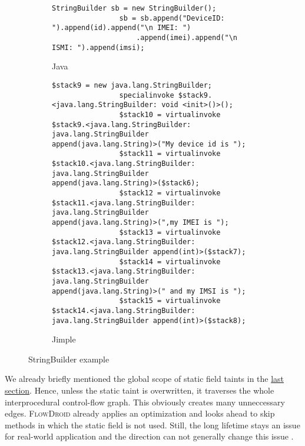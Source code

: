 \documentclass[../draft.tex]{subfiles}
\begin{document}
    \begin{figure}[tbp]
        \centering
        \begin{subfigure}[b]{\textwidth}
            \begin{lstlisting}[gobble=16]
                StringBuilder sb = new StringBuilder();
                sb = sb.append("DeviceID: ").append(id).append("\n IMEI: ")
                    .append(imei).append("\n ISMI: ").append(imsi);
            \end{lstlisting}
            \caption{Java}
        \end{subfigure}
        \qquad
        \begin{subfigure}[b]{\textwidth}
            \begin{lstlisting}[language=Jimple, gobble=16]
                $stack9 = new java.lang.StringBuilder;
                specialinvoke $stack9.<java.lang.StringBuilder: void <init>()>();
                $stack10 = virtualinvoke $stack9.<java.lang.StringBuilder: java.lang.StringBuilder append(java.lang.String)>("My device id is ");
                $stack11 = virtualinvoke $stack10.<java.lang.StringBuilder: java.lang.StringBuilder append(java.lang.String)>($stack6);
                $stack12 = virtualinvoke $stack11.<java.lang.StringBuilder: java.lang.StringBuilder append(java.lang.String)>(",my IMEI is ");
                $stack13 = virtualinvoke $stack12.<java.lang.StringBuilder: java.lang.StringBuilder append(int)>($stack7);
                $stack14 = virtualinvoke $stack13.<java.lang.StringBuilder: java.lang.StringBuilder append(java.lang.String)>(" and my IMSI is ");
                $stack15 = virtualinvoke $stack14.<java.lang.StringBuilder: java.lang.StringBuilder append(int)>($stack8);       
            \end{lstlisting}
            \caption{Jimple}
        \end{subfigure}
        \caption{StringBuilder example}
        \label{lst:stringbuilder}
    \end{figure}

    We already briefly mentioned the global scope of static field taints in the \hyperref[s:rules]{last section}. 
    Hence, unless the static taint is overwritten, it traverses the whole interprocedural control-flow graph. 
    This obviously creates many unneccessary edges. \textsc{FlowDroid} already applies an optimization and looks ahead to skip methods in which the static field is not used. 
    Still, the long lifetime stays an issue for real-world application and the direction can not generally change this issue \cite{Arzt2017PhD}.
\end{document}
